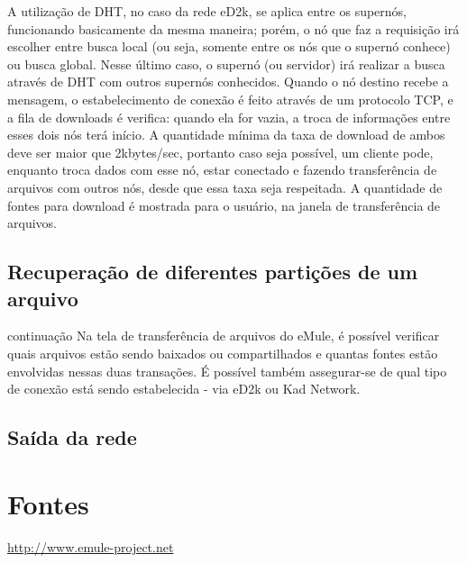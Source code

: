 \documentclass[a4paper]{article}
\begin{document}
		A  utilização de DHT, no caso da rede eD2k, se aplica entre os supernós, funcionando basicamente da mesma maneira; porém, 
o nó que faz a requisição irá escolher entre busca local (ou seja, somente entre os nós que o supernó conhece) ou busca global. Nesse 
último caso, o supernó (ou servidor) irá realizar a busca através de DHT com outros supernós conhecidos. Quando o nó destino recebe a 
mensagem, o estabelecimento de conexão é feito através de um protocolo TCP, e a fila de downloads é verifica: quando ela for vazia, a 
troca de informações entre esses dois nós terá início. A quantidade mínima da taxa de download de ambos deve ser maior que 2kbytes/sec, 
portanto caso seja possível, um cliente pode, enquanto troca dados com esse nó, estar conectado e fazendo transferência de arquivos com 
outros nós, desde que essa taxa seja respeitada. A quantidade de fontes para download é mostrada para o usuário, na janela de 
transferência de arquivos.

	\subsection{Recuperação de diferentes partições de um arquivo}
	{continuação}
		Na tela de transferência de arquivos do eMule, é possível verificar quais arquivos estão sendo baixados ou compartilhados 
e quantas fontes estão envolvidas nessas duas transações. É possível também assegurar-se de qual tipo de conexão está sendo estabelecida - 
via eD2k ou Kad Network.
	\subsection{Saída da rede}

\section{Fontes}
	\url{http://www.emule-project.net}
	
\end{document}
